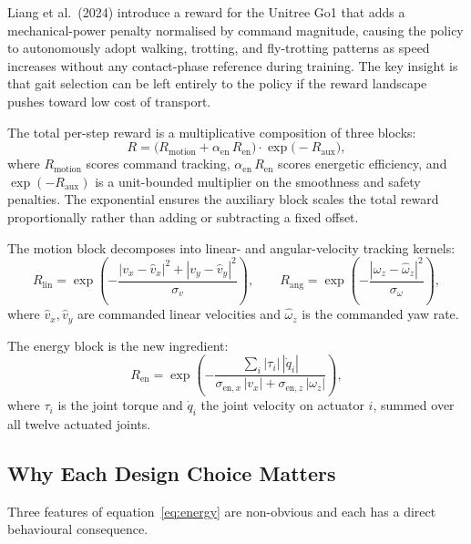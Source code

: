 \documentclass[a4paper,11pt]{article}
\begin{document}
    Liang et al.\ (2024) \cite{liang2024} introduce a reward for the Unitree Go1 that adds a mechanical-power penalty normalised by command magnitude, causing the policy to autonomously adopt walking, trotting, and fly-trotting patterns as speed increases without any contact-phase reference during training. The key insight is that gait selection can be left entirely to the policy if the reward landscape pushes toward low cost of transport.

    The total per-step reward is a multiplicative composition of three blocks:
    \begin{equation}
    R = \big( R_{\mathrm{motion}} + \alpha_{\mathrm{en}}\, R_{\mathrm{en}} \big) \cdot \exp\!\big( - R_{\mathrm{aux}} \big),
    \label{eq:total}
    \end{equation}
    where $R_{\mathrm{motion}}$ scores command tracking, $\alpha_{\mathrm{en}}\,R_{\mathrm{en}}$ scores energetic efficiency, and $\exp(-R_{\mathrm{aux}})$ is a unit-bounded multiplier on the smoothness and safety penalties. The exponential ensures the auxiliary block scales the total reward proportionally rather than adding or subtracting a fixed offset.

    The motion block decomposes into linear- and angular-velocity tracking kernels:
    \begin{equation}
    R_{\mathrm{lin}} = \exp\!\left( - \frac{ |v_x - \hat v_x|^2 + |v_y - \hat v_y|^2 }{\sigma_v} \right), \qquad R_{\mathrm{ang}} = \exp\!\left( - \frac{ |\omega_z - \hat\omega_z|^2 }{\sigma_\omega} \right),
    \label{eq:motion}
    \end{equation}
    where $\hat v_x,\hat v_y$ are commanded linear velocities and $\hat\omega_z$ is the commanded yaw rate.

    The energy block is the new ingredient:
    \begin{equation}
    R_{\mathrm{en}} = \exp\!\left( - \frac{ \sum_i |\tau_i| \, |\dot q_i| }{ \sigma_{\mathrm{en},x}\, |v_x| + \sigma_{\mathrm{en},z}\, |\omega_z| } \right),
    \label{eq:energy}
    \end{equation}
    where $\tau_i$ is the joint torque and $\dot q_i$ the joint velocity on actuator $i$, summed over all twelve actuated joints.

    \subsection{Why Each Design Choice Matters}

    Three features of equation~\eqref{eq:energy} are non-obvious and each has a direct behavioural consequence.
\end{document}
